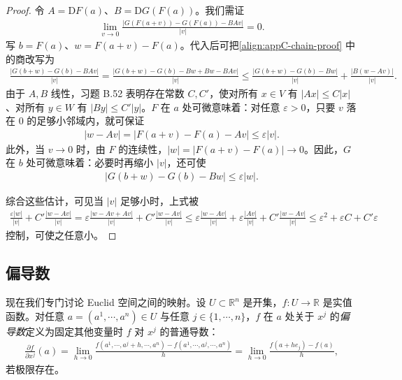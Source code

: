 \documentclass[../../main.tex]{subfiles}
\begin{document}
\begin{proof}
令 $A=\mathrm{D}F(a)$、$B=\mathrm{D}G(F(a))$。我们需证
\begin{align}\label{align:appC-chain-proof}
\lim_{v\to0}\frac{|G(F(a+v))-G(F(a))-BAv|}{|v|}=0.
\end{align}
写 $b=F(a)$、$w=F(a+v)-F(a)$。代入后可把\eqref{align:appC-chain-proof} 中的商改写为
\begin{align*}
\frac{|G(b+w)-G(b)-BAv|}{|v|}
=\frac{|G(b+w)-G(b)-Bw+Bw-BAv|}{|v|}
\leqslant\frac{|G(b+w)-G(b)-Bw|}{|v|}
+\frac{|B(w-Av)|}{|v|}.
\end{align*}
由于 $A,B$ 线性，习题 B.52 表明存在常数 $C,C'$，使对所有 $x\in V$ 有 $|Ax|\leqslant C|x|$、对所有 $y\in W$ 有 $|By|\leqslant C'|y|$。$F$ 在 $a$ 处可微意味着：对任意 $\varepsilon>0$，只要 $v$ 落在 $0$ 的足够小邻域内，就可保证
\begin{align*}
|w-Av|=|F(a+v)-F(a)-Av|\leqslant\varepsilon|v|.
\end{align*}
此外，当 $v\to0$ 时，由 $F$ 的连续性，$|w|=|F(a+v)-F(a)|\to0$。因此，$G$ 在 $b$ 处可微意味着：必要时再缩小 $|v|$，还可使
\begin{align*}
|G(b+w)-G(b)-Bw|\leqslant\varepsilon|w|.
\end{align*}

综合这些估计，可见当 $|v|$ 足够小时，上式被
\begin{align*}
\frac{\varepsilon|w|}{|v|}+C'\frac{|w-Av|}{|v|}
=\varepsilon\frac{|w-Av+Av|}{|v|}+C'\frac{|w-Av|}{|v|}
\leqslant\varepsilon\frac{|w-Av|}{|v|}+\varepsilon\frac{|Av|}{|v|}+C'\frac{|w-Av|}{|v|}
\leqslant\varepsilon^2+\varepsilon C+C'\varepsilon
\end{align*}
控制，可使之任意小。
\end{proof}

\subsection*{偏导数}

现在我们专门讨论 Euclid 空间之间的映射。设 $U\subset\mathbb R^n$ 是开集，$f:U\to\mathbb R$ 是实值函数。对任意 $a=(a^1,\cdots ,a^n)\in U$ 与任意 $j\in\{1,\cdots ,n\}$，$f$ 在 $a$ 处关于 $x^j$ 的\emph{偏导数}定义为固定其他变量时 $f$ 对 $x^j$ 的普通导数：
\begin{align*}
\frac{\partial f}{\partial x^j}(a)=\lim_{h\to0}\frac{f(a^1,\cdots ,a^j+h,\cdots ,a^n)-f(a^1,\cdots ,a^j,\cdots ,a^n)}{h}
=\lim_{h\to0}\frac{f(a+he_j)-f(a)}{h},
\end{align*}
若极限存在。
\end{document}

